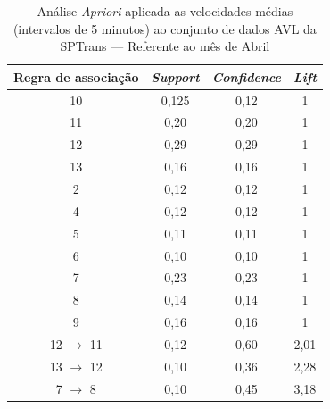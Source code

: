 \documentclass[
	12pt,				%
	oneside,			%
	a4paper,			%
	english,			%
	brazil				%
	]{abntex2ppgsi}
\begin{document}
{{\begin{apendicesenv}
\begin{table}[!htb]
\centering
\caption {Análise \textit{Apriori} aplicada as velocidades médias (intervalos de 5 minutos) ao conjunto de dados AVL da SPTrans --- Referente ao mês de Abril}
\label {tab:aprioriApril}
\begin{tabular}{c|c|c|c}
\toprule
\textbf{Regra de associação} & \textit{\textbf{Support}} & \textit{\textbf{Confidence}} & \textit{\textbf{Lift}} \\
\midrule 
10 &  0,125 &  0,12 &  1\\
\hline
11 &  0,20 &  0,20 &  1\\
\hline
12 &  0,29 &  0,29 &  1\\
\hline
13 &  0,16 &  0,16 &  1\\
\hline
2 &  0,12 &  0,12 &  1\\
\hline
4 &  0,12 &  0,12 &  1\\
\hline
5 &  0,11 &  0,11 &  1\\
\hline
6 &  0,10 &  0,10 &  1\\
\hline
7 &  0,23 &  0,23 &  1\\
\hline
8 &  0,14 &  0,14 &  1\\
\hline
9 &  0,16 &  0,16 &  1\\
\hline
12  $\rightarrow$ 11 &  0,12 &  0,60 &  2,01\\
\hline
13  $\rightarrow$ 12 &  0,10 &  0,36&  2,28\\
\hline
7  $\rightarrow$ 8 &  0,10 &  0,45 &  3,18\\
\bottomrule
\end{tabular}
\end{table}


\end{apendicesenv}}}
\end{document}
